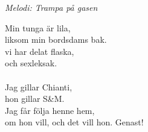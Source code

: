 {\footnotesize\textit{Melodi: Trampa på gasen}}\par
\vspace{10pt}
Min tunga är lila,\\
liksom min bordsdams bak.\\
vi har delat flaska,\\
och sexleksak.\\
\\
Jag gillar Chianti,\\
hon gillar S\&M.\\
Jag får följa henne hem,\\
om hon vill, och det vill hon. Genast!
